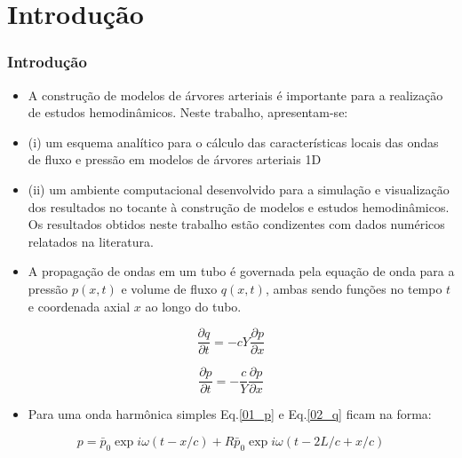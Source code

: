 \documentclass[10pt]{beamer}
\theoremstyle{remark}
\theoremstyle{definition}
\begin{document}
	\section{Introdução}
	\begin{frame}[allowframebreaks]
		\frametitle{Introdução}
		
		\begin{itemize}
			\item A construção de modelos de árvores arteriais é importante para a realização de estudos hemodinâmicos. Neste trabalho, apresentam-se: 
			\item (i) um esquema analítico para o cálculo das características locais das ondas de fluxo e pressão em modelos de árvores arteriais 1D 
			\item (ii) um ambiente computacional desenvolvido para a simulação e visualização dos resultados no tocante à construção de modelos e estudos hemodinâmicos. Os resultados obtidos neste trabalho estão condizentes com dados numéricos relatados na literatura.
			
		\end{itemize}
		
		\framebreak
		
		\begin{itemize}
			\item A propagação de ondas em um tubo é governada pela equação de onda para a pressão $p(x,t)$ e volume de fluxo $q(x,t)$, ambas sendo funções no tempo $t$ e coordenada axial $x$ ao longo do tubo.
		\end{itemize}
		

		\begin{equation}
		\frac{\partial q}{\partial t} = -cY \frac{\partial p}{\partial x}  
		\label{01_p}
		\end{equation}
		
		\begin{equation}
		\frac{\partial p}{\partial t} = -\frac{c}{Y} \frac{\partial p}{\partial x}  
		\label{02_q}
		\end{equation}
		
		\framebreak
		\begin{itemize}
			\item Para uma onda harmônica simples Eq.\ref{01_p} e Eq.\ref{02_q} ficam na forma:
		\end{itemize}
		

		\begin{equation}
		p = \bar{p}_0 \exp{i\omega(t - x/c)} + R  \bar{p}_0 \exp{i\omega(t - 2L/c + x/c)}
		\label{03_p}
		\end{equation}
		

\end{frame}
\end{document}
